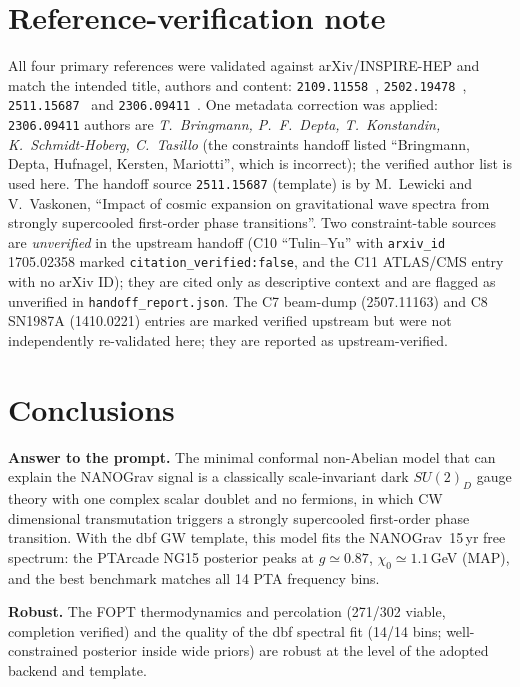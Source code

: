 \documentclass[11pt]{article}
\newcommand{\chizero}{\chi_0}
\begin{document}
\section{Reference-verification note}
\label{sec:refnote}
All four primary references were validated against arXiv/INSPIRE-HEP and match the intended title,
authors and content: \texttt{2109.11558}~\cite{Borah2021}, \texttt{2502.19478}~\cite{Balan2025},
\texttt{2511.15687}~\cite{LewickiVaskonen2025} and \texttt{2306.09411}~\cite{Bringmann2023}. One
metadata correction was applied: \texttt{2306.09411} authors are \emph{T.~Bringmann, P.~F.~Depta,
T.~Konstandin, K.~Schmidt-Hoberg, C.~Tasillo} (the constraints handoff listed
``Bringmann, Depta, Hufnagel, Kersten, Mariotti'', which is incorrect); the verified author list is
used here. The handoff source \texttt{2511.15687} (template) is by M.~Lewicki and V.~Vaskonen, ``Impact
of cosmic expansion on gravitational wave spectra from strongly supercooled first-order phase
transitions''. Two constraint-table sources are \emph{unverified} in the upstream handoff
(C10 ``Tulin--Yu'' with \texttt{arxiv\_id} 1705.02358 marked \texttt{citation\_verified:false}, and the
C11 ATLAS/CMS entry with no arXiv ID); they are cited only as descriptive context and are flagged as
unverified in \texttt{handoff\_report.json}. The C7 beam-dump (2507.11163) and C8 SN1987A (1410.0221)
entries are marked verified upstream but were not independently re-validated here; they are reported as
upstream-verified.

\section{Conclusions}
\label{sec:conclusions}
\textbf{Answer to the prompt.} The minimal conformal non-Abelian model that can explain the NANOGrav
signal is a classically scale-invariant dark $SU(2)_D$ gauge theory with one complex scalar doublet
and no fermions, in which CW dimensional transmutation triggers a strongly supercooled first-order
phase transition. With the dbf GW template, this model fits the NANOGrav~15\,yr free spectrum: the
PTArcade NG15 posterior peaks at $g\simeq0.87$, $\chizero\simeq1.1\,$GeV (MAP), and the best benchmark
matches all 14 PTA frequency bins.

\textbf{Robust.} The FOPT thermodynamics and percolation (271/302 viable, completion verified) and the
quality of the dbf spectral fit (14/14 bins; well-constrained posterior inside wide priors) are robust
at the level of the adopted backend and template.
\end{document}
